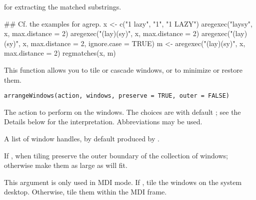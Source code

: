 %
\begin{SeeAlso}\relax
{} for extracting the matched substrings.
\end{SeeAlso}
%
\begin{Examples}
\begin{ExampleCode}
## Cf. the examples for agrep.
x <- c("1 lazy", "1", "1 LAZY")
aregexec("laysy", x, max.distance = 2)
aregexec("(lay)(sy)", x, max.distance = 2)
aregexec("(lay)(sy)", x, max.distance = 2, ignore.case = TRUE)
m <- aregexec("(lay)(sy)", x, max.distance = 2)
regmatches(x, m)
\end{ExampleCode}
\end{Examples}
%
\begin{Description}\relax
This function allows you to tile or cascade windows, or to minimize or restore them.
\end{Description}
%
\begin{Usage}
\begin{verbatim}
arrangeWindows(action, windows, preserve = TRUE, outer = FALSE)
\end{verbatim}
\end{Usage}
%
\begin{Arguments}
\begin{ldescription}
\item[\code{action}] 
The action to perform on the windows.  The choices are  with default ; see the Details below for the interpretation.
Abbreviations may be used.

\item[\code{windows}] 
A list of window handles, by default produced by .  

\item[\code{preserve}] 
If , when tiling preserve the outer boundary of the collection of windows; otherwise 
make them as large as will fit.

\item[\code{outer}] 
This argument is only used in MDI mode.  If , tile the windows on the system
desktop.  Otherwise, tile them within the MDI frame.

\end{ldescription}
\end{Arguments}
%
